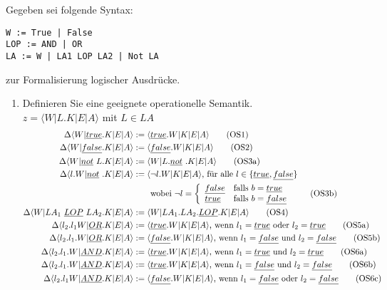 \documentclass[ngerman,a4paper]{report}
\begin{document}
Gegeben sei folgende Syntax:
\begin{lstlisting}
W := True | False
LOP := AND | OR
LA := W | LA1 LOP LA2 | Not LA
\end{lstlisting}
zur Formalisierung logischer Ausdrücke.
\begin{enumerate}
\item Definieren Sie eine geeignete operationelle Semantik.\\
$z=\langle W|L.K|E|A\rangle$ mit $L \in LA$
\begin{align}
\Delta\langle W|\underline{true}.K|E|A\rangle &:= \langle \underline{true}.W|K|E|A\rangle\tag{OS1}\\
\Delta\langle W|\underline{false}.K|E|A\rangle &:= \langle \underline{false}.W|K|E|A\rangle\tag{OS2}\\
\Delta\langle W|\underline{not}\  L.K|E|A\rangle &:= \langle W|L.\underline{not}\ .K|E|A\rangle\tag{OS3a}\\
\Delta\langle l.W|\underline{not}\ .K|E|A\rangle &:= \langle \neg l.W|K|E|A\rangle\text{, für alle }l\in \{\underline{true},\underline{false}\}\notag\\&\quad\quad\text{wobei }\neg l = \left\lbrace\begin{array}{l l}\underline{false}& \text{falls } b=\underline{true}\\\underline{true}& \text{falls } b=\underline{false}\\\end{array}\right.\tag{OS3b}\\
\Delta\langle W|LA_1\ \underline{LOP}\ LA_2.K|E|A\rangle &:= \langle W|LA_1.LA_2.\underline{LOP}.K|E|A\rangle\tag{OS4}\\
\Delta\langle l_2.l_1W|\underline{OR}.K|E|A\rangle &:= \langle \underline{true}.W|K|E|A\rangle\text{, wenn }l_1=\underline{true}\text{ oder }l_2=\underline{true}\tag{OS5a}\\
\Delta\langle l_2.l_1.W|\underline{OR}.K|E|A\rangle &:= \langle \underline{false}.W|K|E|A\rangle\text{, wenn }l_1=\underline{false}\text{ und }l_2=\underline{false}\tag{OS5b}\\
\Delta\langle l_2.l_1.W|\underline{AND}.K|E|A\rangle &:= \langle \underline{true}.W|K|E|A\rangle\text{, wenn }l_1=\underline{true}\text{ und }l_2=\underline{true}\tag{OS6a}\\
\Delta\langle l_2.l_1.W|\underline{AND}.K|E|A\rangle &:= \langle \underline{true}.W|K|E|A\rangle\text{, wenn }l_1=\underline{false}\text{ und }l_2=\underline{false}\tag{OS6b}\\
\Delta\langle l_2.l_1W|\underline{AND}.K|E|A\rangle &:= \langle \underline{false}.W|K|E|A\rangle\text{, wenn }l_1=\underline{false}\text{ oder }l_2=\underline{false}\tag{OS6c}\\\notag

\end{align}
\end{enumerate}
\end{document}
